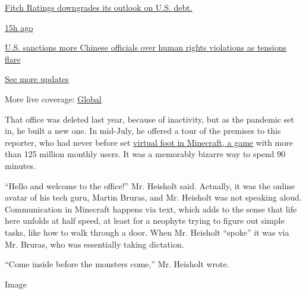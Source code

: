 \href{https://www.nytimes.com/live/2020/07/31/business/stock-market-today-coronavirus?action=click\&pgtype=Article\&state=default\&region=MAIN_CONTENT_1\&context=storylines_live_updates\#fitch-ratings-downgrades-its-outlook-on-us-debt}{Fitch
Ratings downgrades its outlook on U.S. debt.}

\href{https://www.nytimes.com/live/2020/07/31/business/stock-market-today-coronavirus?action=click\&pgtype=Article\&state=default\&region=MAIN_CONTENT_1\&context=storylines_live_updates\#us-sanctions-more-chinese-officials-over-human-rights-violations-as-tensions-flare}{15h
ago}

\href{https://www.nytimes.com/live/2020/07/31/business/stock-market-today-coronavirus?action=click\&pgtype=Article\&state=default\&region=MAIN_CONTENT_1\&context=storylines_live_updates\#us-sanctions-more-chinese-officials-over-human-rights-violations-as-tensions-flare}{U.S.
sanctions more Chinese officials over human rights violations as
tensions flare}

\href{https://www.nytimes.com/live/2020/07/31/business/stock-market-today-coronavirus?action=click\&pgtype=Article\&state=default\&region=MAIN_CONTENT_1\&context=storylines_live_updates}{See
more updates}

More live coverage:
\href{https://www.nytimes.com/2020/07/31/world/coronavirus-covid-19.html?action=click\&pgtype=Article\&state=default\&region=MAIN_CONTENT_1\&context=storylines_live_updates}{Global}

That office was deleted last year, because of inactivity, but as the
pandemic set in, he built a new one. In mid-July, he offered a tour of
the premises to this reporter, who had never before set
\href{https://www.nytimes.com/2016/04/17/magazine/the-minecraft-generation.html}{virtual
foot in Minecraft, a game} with more than 125 million monthly users. It
was a memorably bizarre way to spend 90 minutes.

``Hello and welcome to the office!'' Mr. Heisholt said. Actually, it was
the online avatar of his tech guru, Martin Bruras, and Mr. Heisholt was
not speaking aloud. Communication in Minecraft happens via text, which
adds to the sense that life here unfolds at half speed, at least for a
neophyte trying to figure out simple tasks, like how to walk through a
door. When Mr. Heisholt ``spoke'' it was via Mr. Bruras, who was
essentially taking dictation.

``Come inside before the monsters come,'' Mr. Heisholt wrote.

Image

